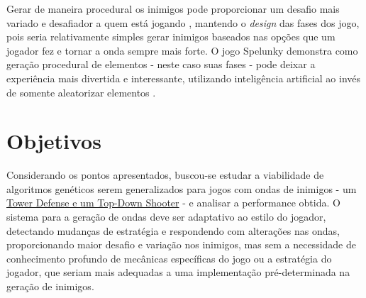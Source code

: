 


Gerar de maneira procedural os inimigos pode proporcionar um desafio mais variado e desafiador a quem está jogando \citep{shaker-16}, mantendo o \textit{design} das fases dos jogo, pois seria relativamente simples gerar inimigos baseados nas opções que um jogador fez e tornar a onda sempre mais forte. O jogo Spelunky \citet{Spelunky} demonstra como geração procedural de elementos - neste caso suas fases - pode deixar a experiência mais divertida e interessante, utilizando inteligência artificial ao invés de somente aleatorizar elementos \citep{spelunky:pcmag}.




\section{Objetivos}
\label{sec:objetivos}

Considerando os pontos apresentados, buscou-se estudar a viabilidade de algoritmos genéticos serem generalizados para jogos com ondas de inimigos - um \hyperref[sec:jogos-ondas]{Tower Defense e um Top-Down Shooter} - e analisar a performance obtida. O sistema para a geração de ondas deve ser adaptativo ao estilo do jogador, detectando mudanças de estratégia e respondendo com alterações nas ondas, proporcionando maior desafio e variação nos inimigos, mas sem a necessidade de conhecimento profundo de mecânicas específicas do jogo ou a estratégia do jogador, que seriam mais adequadas a uma implementação pré-determinada na geração de inimigos.

